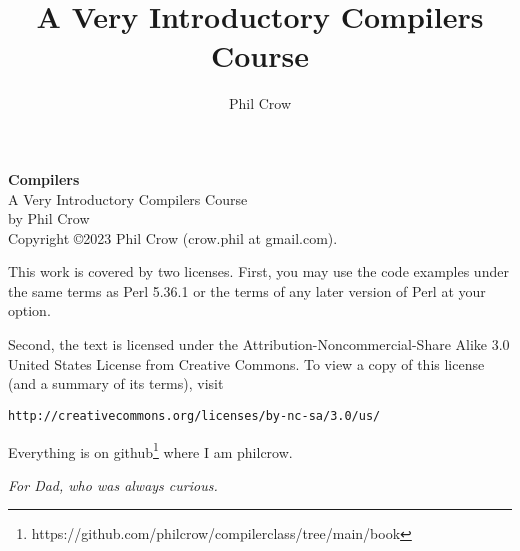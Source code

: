 \documentclass{book}
\begin{document}
\frontmatter
\pagestyle{empty}
\title{A Very Introductory Compilers Course}
\author{Phil Crow}
\date{}
\maketitle

\noindent
\textbf{Compilers} \\
A Very Introductory Compilers Course \\
by Phil Crow \\

\vspace{.2in}
\noindent
Copyright \copyright 2023 Phil Crow (crow.phil at gmail.com).

\noindent
This work is covered by two licenses.  First, you may use the code examples
under the same terms as Perl 5.36.1 or the terms of any later version
of Perl at your option.

Second, the text is licensed under the
Attribution-Noncommercial-Share Alike 3.0 United States License
from Creative Commons.
To view a copy of this license (and a summary of its terms), visit

\begin{verbatim}
http://creativecommons.org/licenses/by-nc-sa/3.0/us/
\end{verbatim}

Everything is on github\footnote{https://github.com/philcrow/compilerclass/tree/main/book} where I am philcrow.

\newpage
\pagestyle{headings}

\begin{center}
\textit{For Dad, who was always curious.}
\end{center}

\tableofcontents



\mainmatter
{}









\backmatter
{}
\printindex
\end{document}
